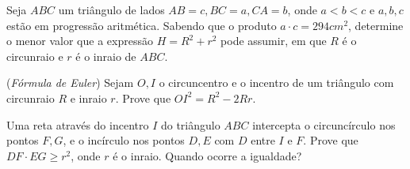 \begin{questao}
  Seja $ABC$ um triângulo de lados $AB=c,BC=a,CA=b$,
  onde $a<b<c$ e $a,b,c$ estão em progressão aritmética. Sabendo
  que o produto $a \cdot c = 294cm^2$, determine o menor valor que a
  expressão $H=R^2+r^2$ pode assumir, em que $R$ é o circunraio e
  $r$ é o inraio de $ABC$.
\end{questao}

\begin{questao}
  ({\it Fórmula de Euler}) Sejam $O,I$ o circuncentro e o
  incentro de um triângulo com circunraio $R$ e inraio $r$. Prove
  que $OI^2=R^2-2Rr$.
\end{questao}

\begin{questao}
  Uma reta através do incentro $I$ do triângulo $ABC$
  intercepta o circuncírculo nos pontos $F,G$, e o incírculo nos
  pontos $D,E$ com $D$ entre $I$ e $F$. Prove que $DF \cdot
  EG \geq r^2$, onde $r$ é o inraio. Quando ocorre a igualdade?
\end{questao}

